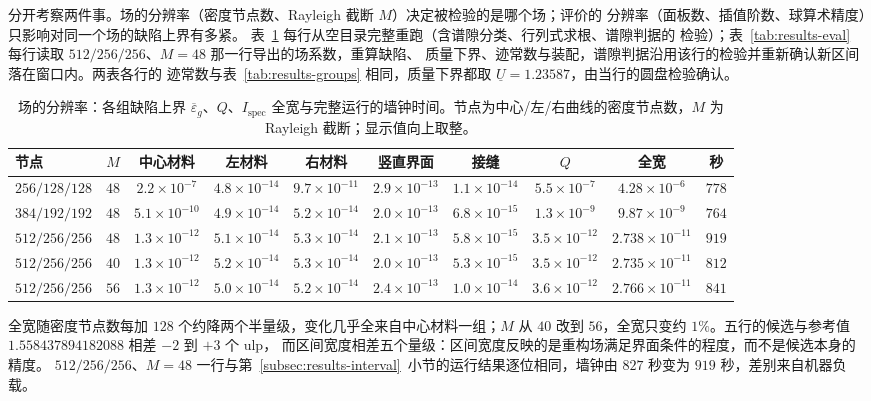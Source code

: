 分开考察两件事。场的分辨率（密度节点数、Rayleigh 截断 $M$）决定被检验的是哪个场；评价的
分辨率（面板数、插值阶数、球算术精度）只影响对同一个场的缺陷上界有多紧。
表~\ref{tab:results-resolution} 每行从空目录完整重跑（含谱隙分类、行列式求根、谱隙判据的
检验）；表~\ref{tab:results-eval} 每行读取 $512/256/256$、$M=48$ 那一行导出的场系数，重算缺陷、
质量下界、迹常数与装配，谱隙判据沿用该行的检验并重新确认新区间落在窗口内。两表各行的
迹常数与表~\ref{tab:results-groups} 相同，质量下界都取 $\underline U=1.23587$，由当行的圆盘检验确认。
\begin{table}[htbp]
  \centering
  \footnotesize
  \setlength{\tabcolsep}{2.5pt}
  \caption{场的分辨率：各组缺陷上界 $\overline\varepsilon_g$、$Q$、$I_{\mathrm{spec}}$ 全宽与完整运行的墙钟时间。节点为中心/左/右曲线的密度节点数，$M$ 为 Rayleigh 截断；显示值向上取整。}
  \label{tab:results-resolution}
  \begin{tabular}{lccccccccc}
    \toprule
    节点 & $M$ & 中心材料 & 左材料 & 右材料 & 竖直界面 & 接缝 & $Q$ & 全宽 & 秒\\
    \midrule
    $256/128/128$ & $48$ & $2.2\times10^{-7}$ & $4.8\times10^{-14}$ & $9.7\times10^{-11}$ & $2.9\times10^{-13}$ & $1.1\times10^{-14}$ & $5.5\times10^{-7}$ & $4.28\times10^{-6}$ & $778$\\
    $384/192/192$ & $48$ & $5.1\times10^{-10}$ & $4.9\times10^{-14}$ & $5.2\times10^{-14}$ & $2.0\times10^{-13}$ & $6.8\times10^{-15}$ & $1.3\times10^{-9}$ & $9.87\times10^{-9}$ & $764$\\
    $512/256/256$ & $48$ & $1.3\times10^{-12}$ & $5.1\times10^{-14}$ & $5.3\times10^{-14}$ & $2.1\times10^{-13}$ & $5.8\times10^{-15}$ & $3.5\times10^{-12}$ & $2.738\times10^{-11}$ & $919$\\
    $512/256/256$ & $40$ & $1.3\times10^{-12}$ & $5.2\times10^{-14}$ & $5.3\times10^{-14}$ & $2.0\times10^{-13}$ & $5.3\times10^{-15}$ & $3.5\times10^{-12}$ & $2.735\times10^{-11}$ & $812$\\
    $512/256/256$ & $56$ & $1.3\times10^{-12}$ & $5.0\times10^{-14}$ & $5.2\times10^{-14}$ & $2.4\times10^{-13}$ & $1.0\times10^{-14}$ & $3.6\times10^{-12}$ & $2.766\times10^{-11}$ & $841$\\
    \bottomrule
  \end{tabular}
\end{table}
全宽随密度节点数每加 $128$ 个约降两个半量级，变化几乎全来自中心材料一组；$M$ 从 $40$ 改到
$56$，全宽只变约 $1\%$。五行的候选与参考值 $1.558437894182088$ 相差 $-2$ 到 $+3$ 个 ulp，
而区间宽度相差五个量级：区间宽度反映的是重构场满足界面条件的程度，而不是候选本身的精度。
$512/256/256$、$M=48$ 一行与第~\ref{subsec:results-interval}~小节的运行结果逐位相同，墙钟由
$827$ 秒变为 $919$ 秒，差别来自机器负载。

